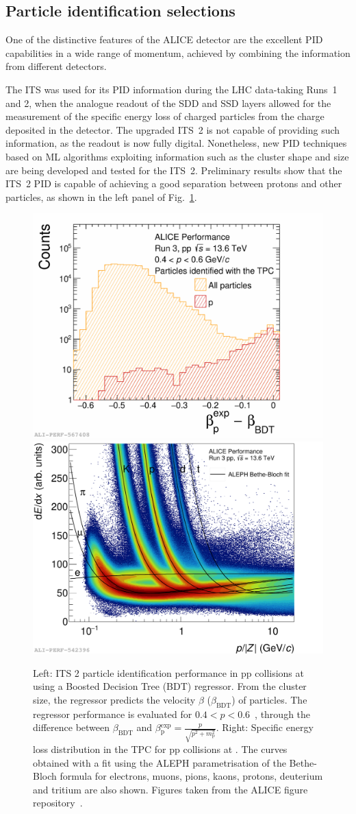 \subsection{Particle identification selections}
One of the distinctive features of the ALICE detector are the excellent PID capabilities in a wide range of momentum, achieved by combining the information from different detectors. 

The ITS was used for its PID information during the LHC data-taking Runs~1 and 2, when the analogue readout of the SDD and SSD layers allowed for the measurement of the specific energy loss \dedx of charged particles from the charge deposited in the detector. The upgraded ITS~2 is not capable of providing such information, as the readout is now fully digital. Nonetheless, new PID techniques based on ML algorithms exploiting information such as the cluster shape and size are being developed and tested for the ITS~2. Preliminary results show that the ITS~2 PID is capable of achieving a good separation between protons and other particles, as shown in the left panel of Fig.~\ref{fig:ITSTPCPID}.

\begin{figure}[htb]
    \centering
    \includegraphics[width=0.48\linewidth]{Figures/Chapter 4/deltabetap-tpctagged.pdf}
    \includegraphics[width=0.48\linewidth]{Figures/Chapter 4/tpcdedx_1.pdf}
    \caption{Left: ITS 2 particle identification performance in pp collisions at \mbox{\thirteen} using a Boosted Decision Tree (BDT) regressor. From the cluster size, the regressor predicts the velocity $\beta$ ($\beta_\mathrm{BDT}$) of particles. The regressor performance is evaluated for $0.4 < p < 0.6$~\gevc, through the difference between $\beta_\mathrm{BDT}$ and $\beta\mathrm{_p^{exp}} = \frac{p}{\sqrt{p^2 + m_\mathrm{p}^2}}$. Right: Specific energy loss distribution \dedx in the TPC for pp collisions at \thirteen. The curves obtained with a fit using the ALEPH parametrisation of the Bethe-Bloch formula for electrons, muons, pions, kaons, protons, deuterium and tritium are also shown. Figures taken from the ALICE figure repository~\cite{ALICE_figures}.}
    \label{fig:ITSTPCPID}
\end{figure}

